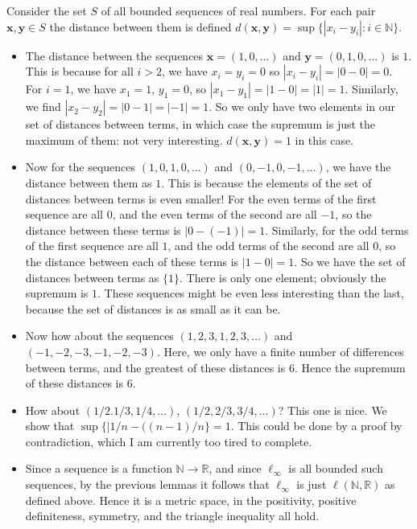 \documentclass[11pt]{article}
\newcommand{\R}{\mathbb{R}}
\newcommand{\N}{\mathbb{N}}
\theoremstyle{definition}
\begin{document}
Consider the set $S$ of all bounded sequences of real numbers. For each pair $\mathbf{x},\mathbf{y}\in S$ the distance between them is defined $d(\mathbf{x},\mathbf{y}) = \sup\{|x_i - y_i|: i\in \N\}$.
\begin{itemize}
\item The distance between the sequences $\mathbf{x} = (1,0,\dots)$ and $\mathbf{y} = (0,1,0,\dots)$ is $1$. This is because for all $i>2$, we have $ x_i = y_i = 0$ so $|x_i - y_i|= |0-0| = 0$. For $i = 1$, we have $x_1 = 1$, $y_1 = 0$, so $|x_1-y_1| = |1-0| = |1| = 1$. Similarly, we find $|x_2-y_2| = |0-1| = |-1| = 1$. So we only have two elements in our set of distances between terms, in which case the supremum is just the maximum of them: not very interesting. $d(\mathbf{x},\mathbf{y}) = 1$ in this case.

\item Now for the sequences $(1,0,1,0,\dots)$ and $(0,-1,0,-1,\dots)$, we have the distance between them as $1$. This is because the elements of the set of distances between terms is even smaller! For the even terms of the first sequence are all $0$, and the even terms of the second are all $-1$, so the distance between these terms is $|0-(-1)| = 1$. Similarly, for the odd terms of the first sequence are all $1$, and the odd terms of the second are all $0$, so the distance between each of these terms is $|1-0| = 1$. So we have the set of distances between terms as $\{1\}$. There is only one element; obviously the supremum is $1$. These sequences might be even less interesting than the last, because the set of distances is as small as it can be.

\item Now how about the sequences $(1,2,3,1,2,3,\dots)$ and $(-1,-2,-3,-1,-2,-3)$. Here, we only have a finite number of differences between terms, and the greatest of these distances is $6$. Hence the supremum of these distances is $6$. 
\item How about $(1/2.1/3,1/4,\dots)$, $(1/2,2/3,3/4,\dots)$? This one is nice. We show that $\sup\{|1/n - ((n-1)/n\} = 1$. This could be done by a proof by contradiction, which I am currently too tired to complete.

\item Since a sequence is a function $\N\to \R$, and since $\ell_\infty$ is all bounded such sequences, by the previous lemmas it follows that $\ell_\infty$ is just $\ell(\N,\R)$ as defined above. Hence it is a metric space, in the positivity, positive definiteness, symmetry, and the triangle inequality all hold.
\end{itemize}
\end{document}
